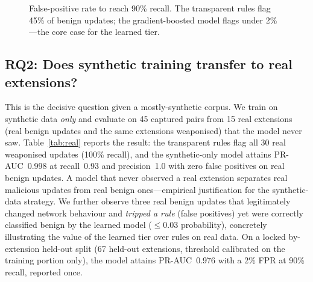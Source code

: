 \documentclass[conference]{IEEEtran}
\begin{document}
\begin{figure}[t]
\centering
{}
\caption{False-positive rate to reach 90\% recall. The transparent rules flag 45\% of benign
updates; the gradient-boosted model flags under 2\%---the core case for the learned tier.}
\label{fig:fpr}
\end{figure}

\subsection{RQ2: Does synthetic training transfer to real extensions?}
This is the decisive question given a mostly-synthetic corpus. We train on synthetic data
\emph{only} and evaluate on 45 captured pairs from 15 real extensions (real benign updates and the
same extensions weaponised) that the model never saw. Table~\ref{tab:real} reports the result: the
transparent rules flag all 30 real weaponised updates (100\% recall), and the synthetic-only model
attains PR-AUC~0.998 at recall~0.93 and precision~1.0 with zero false positives on real benign
updates. A model that never observed a real extension separates real malicious updates from real
benign ones---empirical justification for the synthetic-data strategy. We further observe three
real benign updates that legitimately changed network behaviour and \emph{tripped a rule} (false
positives) yet were correctly classified benign by the learned model ($\le 0.03$ probability),
concretely illustrating the value of the learned tier over rules on real data. On a locked
by-extension held-out split (67 held-out extensions, threshold calibrated on the training portion
only), the model attains PR-AUC~0.976 with a 2\% FPR at 90\% recall, reported once.
\end{document}
